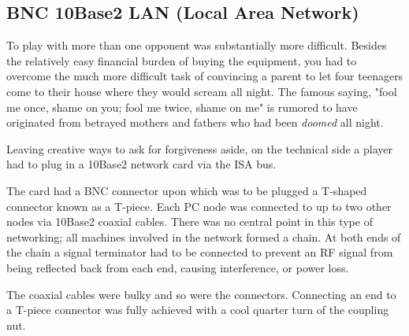 \subsection{BNC 10Base2 LAN (Local Area Network)}
To play with more than one opponent was substantially more difficult. Besides the relatively easy financial burden of buying the equipment, you had to overcome the much more difficult task of convincing a parent to let four teenagers come to their house where they would scream all night. The famous saying, "fool me once, shame on you; fool me twice, shame on me" is rumored to have originated from betrayed mothers and fathers who had been \textit{doomed} all night.\\
\par



\begin{figure}
\centering
{}
\end{figure}

Leaving creative ways to ask for forgiveness aside, on the technical side a player had to plug in a 10Base2 network card via the ISA bus. \\
\par The card had a BNC connector upon which was to be plugged a T-shaped connector known as a T-piece. Each PC node was connected to up to two other nodes via 10Base2 coaxial cables. There was no central point in this type of networking; all machines involved in the network formed a chain. At both ends of the chain a signal terminator had to be connected to prevent an RF signal from being reflected back from each end, causing interference, or power loss.


\begin{figure}
\centering
{}
\end{figure}
The coaxial cables were bulky and so were the connectors. Connecting an end to a T-piece connector was fully achieved with a cool quarter turn of the coupling nut.\\
\par
 
